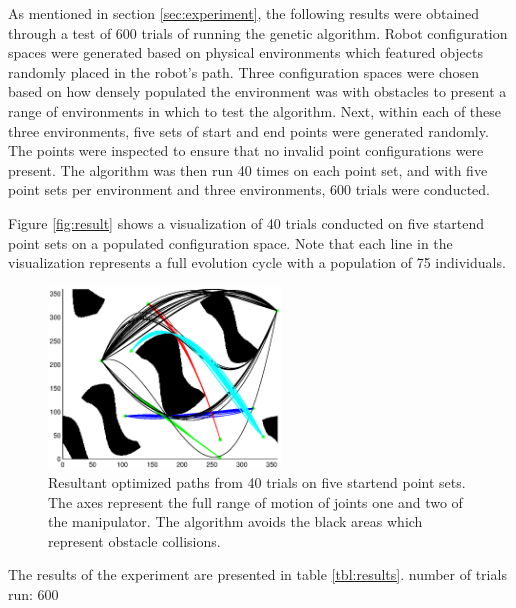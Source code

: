 
As mentioned in section \ref{sec:experiment}, the following results were obtained through a test of 600 trials of running the genetic algorithm. Robot configuration spaces were generated based on physical environments which featured objects randomly placed in the robot's path. Three configuration spaces were chosen based on how densely populated the environment was with obstacles to present a range of environments in which to test the algorithm. Next, within each of these three environments, five sets of start and end points were generated randomly. The points were inspected to ensure that no invalid point configurations were present. The algorithm was then run 40 times on each point set, and with five point sets per environment and three environments, 600 trials were conducted.

Figure \ref{fig:result} shows a visualization of 40 trials conducted on five start\/end point sets on a populated configuration space. Note that each line in the visualization represents a full evolution cycle with a population of 75 individuals.

\begin{figure}[h] \label{fig:result}
	\centering
	\includegraphics[width=0.55\textwidth]{./figures/results_cSpace4.eps}
	\caption{Resultant optimized paths from 40 trials on five start\/end point sets. The axes represent the full range of motion of joints one and two of the manipulator. The algorithm avoids the black areas which represent obstacle collisions.}
	\label{fig:ws2cs}
\end{figure}

The results of the experiment are presented in table \ref{tbl:results}.
number of trials run: 600

